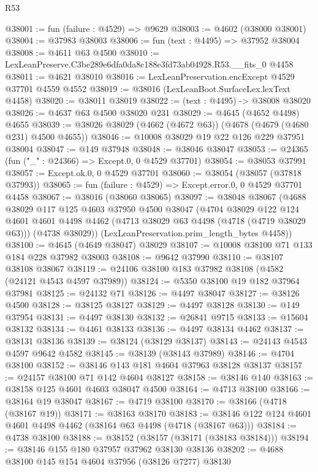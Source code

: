 \begin{lexlean}{R53}
\begin{coremodule}
@38001 := fun (failure : @4529) => @9629
@38003 := @4602 (@38000 @38001)
@38004 := @37983 @38003
@38006 := fun (text : @4495) => @37952 @38004
@38008 := @4611 @63 @4500
@38010 := LexLeanPreserve.C3be289e6dfa0da8c188e3fd73ab04928.R53.__fits_0 @4458
@38011 := @4621 @38010
@38016 := LexLeanPreservation.encExcept @4529 @37701 @4559 @4552
@38019 := @38016 (LexLeanBoot.SurfaceLex.lexText @4458)
@38020 := @38011 @38019
@38022 := (text : @4495) -> @38008 @38020
@38026 := @4637 @63 @4500 @38020 @231
@38029 := @4645 (@4652 @4498) @4655
@38039 := @38026 @38029 (@4662 (@4672 @63)) (@4678 (@4679 (@4680 @231) @4500 @4655))
@38046 := @10008 @38029 @19 @22 @126 @229 @37951 @38004
@38047 := @149 @37948
@38048 := @38046 @38047
@38053 := @24365 (fun ("_" : @24366) => Except.{0, 0} @4529 @37701)
@38054 := @38053 @37991
@38057 := Except.ok.{0, 0} @4529 @37701
@38060 := @38054 (@38057 (@37818 @37993))
@38065 := fun (failure : @4529) => Except.error.{0, 0} @4529 @37701 @4458
@38067 := @38016 (@38060 @38065)
@38097 := @38048
    @38067
    (@4688
      @38029
      @117
      @125
      @4603
      @37950
      @4500
      @38047
      (@4704
        @38029
        @122
        @124
        @4601
        @4601
        @4498
        @4462
        (@4713 @38029 @63 @4498 (@4718 (@4719 @38029 @63)))
        (@4738 @38029))
      (LexLeanPreservation.prim_length_bytes @4458))
@38100 := @4645 (@4649 @38047) @38029
@38107 := @10008 @38100 @71 @133 @184 @228 @37982 @38003
@38108 := @9642 @37990
@38110 := @38107 @38108 @38067
@38119 := @24106 @38100 @183 @37982 @38108 (@4582 (@24121 @4543 @4597 @37989))
@38124 := @5350 @38100 @19 @182 @37964 @37981
@38125 := @24132 @71
@38126 := @4497 @38047
@38127 := @38126 @4500
@38128 := @38125 @38127
@38129 := @4497 @38128
@38130 := @149 @37954
@38131 := @4497 @38130
@38132 := @26841 @9715
@38133 := @15604 @38132
@38134 := @4461 @38133
@38136 := @4497 @38134 @4462
@38137 := @38131 @38136
@38139 := @38124 (@38129 @38137)
@38143 := @24143 @4543 @4597 @9642 @4582
@38145 := @38139 (@38143 @37989)
@38146 := @4704 @38100
@38152 := @38146 @143 @181 @4604 @37963 @38128 @38137
@38157 := @24157 @38100 @71 @142 @4604 @38127
@38158 := @38146 @140
@38163 := @38158 @125 @4601 @4603 @38047 @4500
@38164 := @4713 @38100
@38166 := @38164 @19 @38047
@38167 := @4719 @38100
@38170 := @38166 (@4718 (@38167 @19))
@38171 := @38163 @38170
@38183 := @38146 @122 @124 @4601 @4601 @4498 @4462 (@38164 @63 @4498 (@4718 (@38167 @63)))
@38184 := @4738 @38100
@38188 := @38152 (@38157 (@38171 (@38183 @38184)))
@38194 := @38146 @155 @180 @37957 @37962 @38130 @38136
@38202 := @4688 @38100 @145 @154 @4604 @37956 (@38126 @7277) @38130

\end{coremodule}
\end{lexlean}
